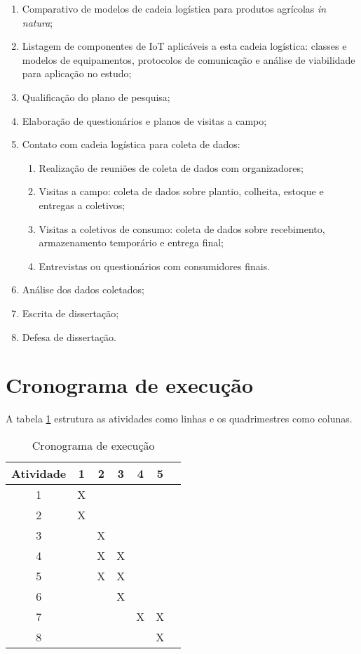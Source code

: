 \documentclass[
	12pt,				%
	openright,			%
	oneside,			%
	a4paper,			%
	english,			%
	french,				%
	spanish,			%
	brazil,				%
	]{abntex2}
\begin{document}
\begin{enumerate}
\item Comparativo de modelos de cadeia logística para produtos agrícolas \textit{in natura};

\item Listagem de componentes de IoT aplicáveis a esta cadeia logística: classes e modelos de equipamentos,  protocolos de comunicação e análise de viabilidade para aplicação no estudo;

\item Qualificação do plano de pesquisa;

\item Elaboração de questionários e planos de visitas a campo;

\item Contato com cadeia logística para coleta de dados: 
\begin{enumerate}
	\item Realização de reuniões de coleta de dados com organizadores;
	\item Visitas a campo: coleta de dados sobre plantio, colheita, estoque e entregas a coletivos;
	\item Visitas a coletivos de consumo: coleta de dados sobre recebimento, armazenamento temporário e entrega final;
	\item Entrevistas ou questionários com consumidores finais.
\end{enumerate}

\item Análise dos dados coletados;

\item Escrita de dissertação;

\item Defesa de dissertação.
\end{enumerate}

\section{Cronograma de execução}

A tabela \ref{tabela:1} estrutura as atividades como linhas e os quadrimestres como colunas.

\begin{table}[h!]
\begin{center}
 \begin{tabular}{|| c || c | c | c | c | c | c ||} 
 \hline
 Atividade  & 1 & 2 & 3 & 4 & 5 \\ [0.5ex] 
 \hline\hline
 1 & X & & & &  \\ 
 \hline
 2 & X & & & &  \\
 \hline
 3 & & X &  & & \\
 \hline
 4 & & X & X & & \\
 \hline
 5 & & X & X & & \\ 
 \hline
 6 & & & X & & \\ 
 \hline
 7 & & & & X & X \\
 \hline
 8 & & & & & X \\ [1ex] 
 \hline
\end{tabular}
\end{center}
\caption{Cronograma de execução}
\label{tabela:1}
\end{table}
\end{document}
